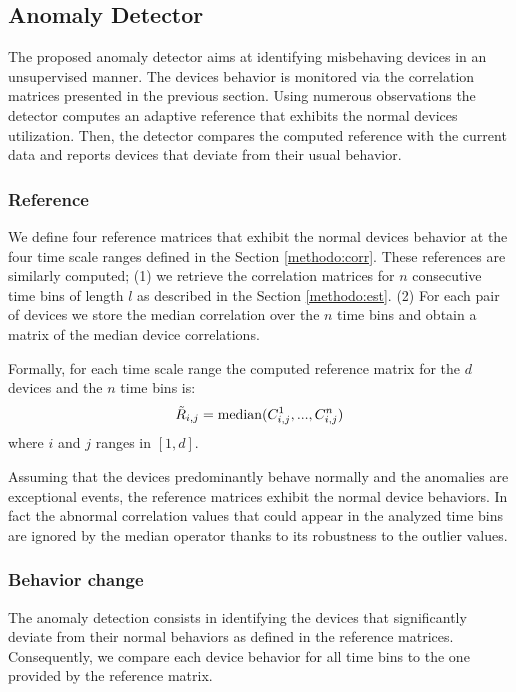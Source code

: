 \subsection{Anomaly Detector}\label{methodo:ano}
The proposed anomaly detector aims at identifying misbehaving devices in an unsupervised manner.
The devices behavior is monitored via the correlation matrices presented in the previous section.
Using numerous observations the detector computes an adaptive reference that exhibits the normal devices utilization.
Then, the detector compares the computed reference with the current data and reports devices that deviate from their usual behavior.

\subsubsection{Reference}
We define four reference matrices that exhibit the normal devices behavior at the four time scale ranges defined in the Section \ref{methodo:corr}.
These references are similarly computed; (1) we retrieve the correlation matrices for $n$ consecutive time bins of length $l$ as described in the Section \ref{methodo:est}. (2) For each pair of devices we store the median correlation over the $n$ time bins and obtain a matrix of the median device correlations.

Formally, for each time scale range the computed reference matrix for the $d$ devices and the $n$ time bins is:
\[\tilde{R}_{i,j} =  \operatorname{median}(C^1_{i,j},...,C^n_{i,j})\]
where $i$ and $j$ ranges in $[1,d]$.

Assuming that the devices predominantly behave normally and the anomalies are exceptional events, the reference matrices exhibit the normal device behaviors.
In fact the abnormal correlation values that could appear in the analyzed time bins are ignored by the median operator thanks to its robustness to the outlier values.

\subsubsection{Behavior change}
The anomaly detection consists in identifying the devices that significantly deviate from their normal behaviors as defined in the reference matrices.
Consequently, we compare each device behavior for all time bins to the one provided by the reference matrix.

